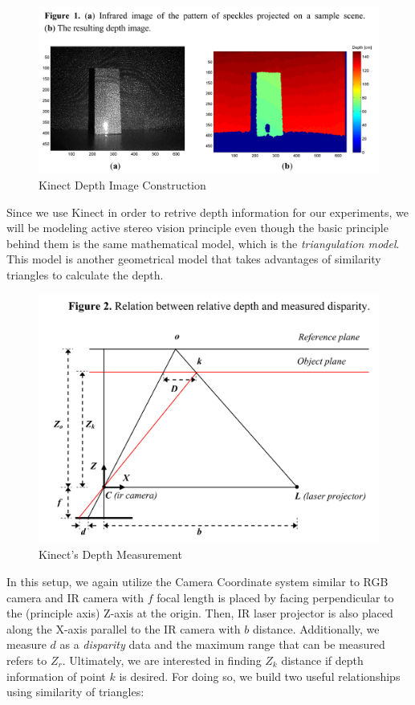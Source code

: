 \documentclass[a4paper]{report}
\numberwithin{figure}{section}
\begin{document}
\begin{figure}[H]
	\centering
  \includegraphics[width=0.7\linewidth,natwidth=640,natheight=640]
  {fig/ref_imgs/kinect_depth_img.png}
  \caption{Kinect Depth Image Construction}
	\label{fig:kinect_depth_img}
\end{figure}

Since we use Kinect in order to retrive depth information for our experiments, 
we will be modeling active stereo vision principle even though the 
basic principle behind them is the same mathematical model, which is 
the \textit{triangulation model}. This model is another geometrical model that 
takes advantages of similarity triangles to calculate the depth. 
\begin{figure}[H]
	\centering
  \includegraphics[width=0.7\linewidth,natwidth=640,natheight=640]
  {fig/ref_imgs/kinect_depth_measurement.png}
  \caption{Kinect's Depth Measurement}
	\label{fig:uncertainty_matching}
\end{figure}

In this setup, 
we again utilize the Camera Coordinate system similar to RGB camera
and IR camera with $f$ focal length is placed by facing perpendicular to 
the (principle axis) Z-axis at the origin. Then, IR laser projector is 
also placed along the X-axis parallel to the IR camera with $b$ distance. 
Additionally, we measure $d$ as a \textit{disparity} data and 
the maximum range that can be measured refers to $Z_r$. Ultimately, we are 
interested in finding $Z_k$ distance if depth information of point $k$ 
is desired. For doing so, we build two useful relationships using similarity of triangles:
\end{document}
